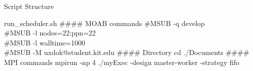 	\begin{frame}{Script Structure}
		
		\begin{block}{run\_scheduler.sh}
		        \#\#\#\# MOAB commands
		        \newline
		        \newline
				\#MSUB  -q develop\\
				\#MSUB  -l nodes=22:ppn=22\\
				\#MSUB  -l walltime=1000\\
				\#MSUB  -M uxdok@student.kit.edu
				\newline
				\newline
        				\#\#\#\# Directory
				\newline
				\newline
				cd ./Documents
				\newline
				\newline
        				\#\#\#\# MPI commands
        			\newline
        			\newline
				mpirun -np 4 ./myExec -design master-worker -strategy fifo
			
		\end{block}
	\end{frame}
	
	